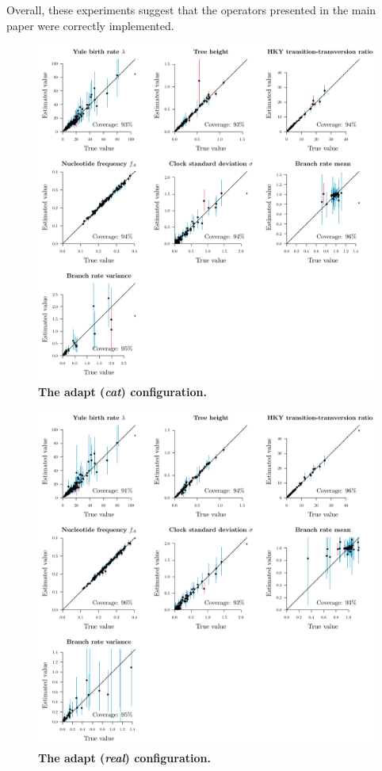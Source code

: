 \documentclass[12pt]{article}
\begin{document}
Overall, these experiments suggest that the operators presented in the main paper were correctly implemented.




\begin{figure}[!htb]
\includegraphics[width=\textwidth]{Figures/N30_cat_adaptive.pdf}
\caption{\textbf{The adapt (\textit{cat}) configuration.} }
\end{figure}


\begin{figure}[!htb]
\includegraphics[width=\textwidth]{Figures/N30_real_adaptive.pdf}
\caption{\textbf{The adapt (\textit{real}) configuration.} }
\end{figure}
\end{document}
